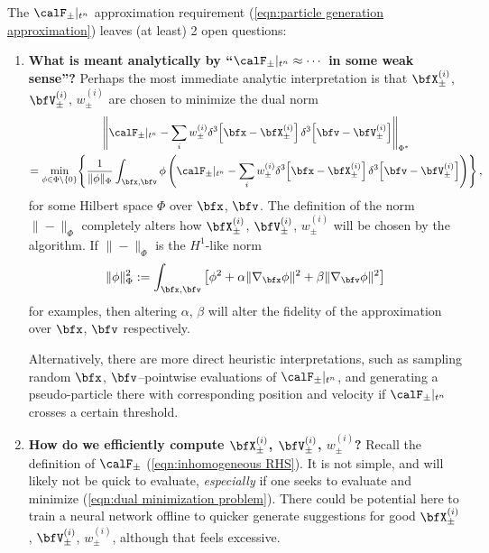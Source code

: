     \begin{remark}
        The $\calF_{\pm}|_{t^{n}}$ approximation requirement (\ref{eqn:particle generation approximation}) leaves (at least) 2 open questions:
        \begin{enumerate}
            \item  {\bf What is meant analytically by ``$\calF_{\pm}|_{t^{n}} \approx \cdots$ in some weak sense''?} Perhaps the most immediate analytic interpretation is that $\bfX_{\pm}^{(i)}$, $\bfV_{\pm}^{(i)}$, $w_{\pm}^{(i)}$ are chosen to minimize the dual norm
            \begin{multline}\label{eqn:dual minimization problem}
                \left\|\calF_{\pm}|_{t^{n}} - \sum_{i}w_{\pm}^{(i)}\delta^{3}\!\left[\bfx - \bfX_{\pm}^{(i)}\right]\delta^{3}\!\left[\bfv - \bfV_{\pm}^{(i)}\right]\right\|_{\Phi^{*}}  \\
                =  \min_{\phi \in \Phi\setminus\{0\}}\!\left\{\frac{1}{\|\phi\|_{\Phi}}\int_{\bfx, \bfv}\phi\left(\calF_{\pm}|_{t^{n}} - \sum_{i}w_{\pm}^{(i)}\delta^{3}\!\left[\bfx - \bfX_{\pm}^{(i)}\right]\delta^{3}\!\left[\bfv - \bfV_{\pm}^{(i)}\right]\right)\right\},
            \end{multline}
            for some Hilbert space $\Phi$ over $\bfx$, $\bfv$. The definition of the norm $\|-\|_{\Phi}$ completely alters how $\bfX_{\pm}^{(i)}$, $\bfV_{\pm}^{(i)}$, $w_{\pm}^{(i)}$ will be chosen by the algorithm. If $\|-\|_{\Phi}$ is the $H^{1}$-like norm
            \begin{equation}
                \|\phi\|_{\Phi}^{2}  :=  \int_{\bfx, \bfv}\left[\phi^{2} + \alpha\|\nabla_{\bfx}\phi\|^{2} + \beta\|\nabla_{\bfv}\phi\|^{2}\right]
            \end{equation}
            for examples, then altering $\alpha$, $\beta$ will alter the fidelity of the approximation over $\bfx$, $\bfv$ respectively.

            Alternatively, there are more direct heuristic interpretations, such as sampling random $\bfx$, $\bfv$--pointwise evaluations of $\calF_{\pm}|_{t^{n}}$, and generating a pseudo-particle there with corresponding position and velocity if $\calF_{\pm}|_{t^{n}}$ crosses a certain threshold.

            \item  {\bf How do we efficiently compute $\bfX_{\pm}^{(i)}$, $\bfV_{\pm}^{(i)}$, $w_{\pm}^{(i)}$?} Recall the definition of $\calF_{\pm}$ (\ref{eqn:inhomogeneous RHS}). It is not simple, and will likely not be quick to evaluate, \emph{especially} if one seeks to evaluate and minimize (\ref{eqn:dual minimization problem}). There could be potential here to train a neural network offline to quicker generate suggestions for good $\bfX_{\pm}^{(i)}$, $\bfV_{\pm}^{(i)}$, $w_{\pm}^{(i)}$, although that feels excessive.
        \end{enumerate}
    \end{remark}

